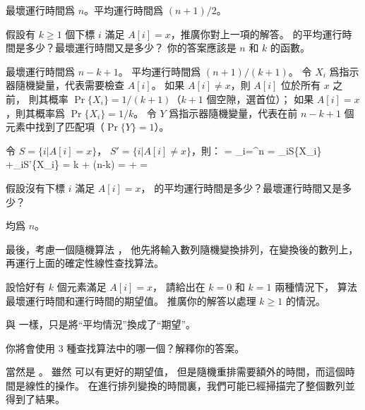 \startANSWER
最壞運行時間爲 $n$。平均運行時間爲 $(n+1)/2$。
\stopANSWER

\startigBase[continue]
\item 假設有 $k\ge 1$ 個下標 $i$ 滿足 $A[i] = x$，推廣你對上一項的解答。
 的平均運行時間是多少？最壞運行時間又是多少？
你的答案應該是 $n$ 和 $k$ 的函數。
\stopigBase

\startANSWER
最壞運行時間爲 $n-k+1$。
平均運行時間爲 $(n+1)/(k+1)$。
令 $X_i$ 爲指示器隨機變量，代表需要檢查 $A[i]$。
如果 $A[i]\ne x$，則 $A[i]$ 位於所有 $x$ 之前，
則其概率 $\Pr\{X_i\} = 1/(k+1)$（$k+1$ 個空隙，選首位）；
如果 $A[i]=x$，則其概率爲 $\Pr\{X_i\}=1/k$。
令 $Y$ 爲指示器隨機變量，代表在前 $n-k+1$ 個元素中找到了匹配項（$\Pr{\{Y\}}=1$）。

令 $S=\{i|A[i]=x\}$， $S'=\{i|A[i]\ne x\}$，則：
\startsplitformula\startmathalignment
\NC \E[X] \NC= \sum_{i=}^{n}\E[X_i] \NR
\NC \NC = \sum_{i\in S}\Pr\{X_i\} +\sum_{i\in S'}\Pr\{X_i\} \NR
\NC \NC = \cdot k + \cdot(n-k) \NR
\NC \NC =  +  \NR
\NC \NC =  \NR
\stopmathalignment\stopsplitformula
\stopANSWER

\startigBase[continue]
\item 假設沒有下標 $i$ 滿足 $A[i] = x$，
 的平均運行時間是多少？最壞運行時間又是多少？
\stopigBase

\startANSWER
均爲 $n$。
\stopANSWER

最後，考慮一個隨機算法 ，
他先將輸入數列隨機變換排列，在變換後的數列上，再運行上面的確定性線性查找算法。
\startigBase[continue]
\item 設恰好有 $k$ 個元素滿足 $A[i] = x$，
請給出在 $k=0$ 和 $k=1$ 兩種情況下，
算法  最壞運行時間和運行時間的期望值。
推廣你的解答以處理 $k\ge 1$ 的情況。
\stopigBase

\startANSWER
與  一樣，只是將“平均情況”換成了“期望”。
\stopANSWER

\startigBase[continue]
\item 你將會使用 3 種查找算法中的哪一個？解釋你的答案。
\stopigBase

\startANSWER
當然是 。
雖然  可以有更好的期望值，
但是隨機重排需要額外的時間，而這個時間是線性的操作。
在進行排列變換的時間裏，我們可能已經掃描完了整個數列並得到了結果。
\stopANSWER

\stopPROBLEM

\stopsubject
